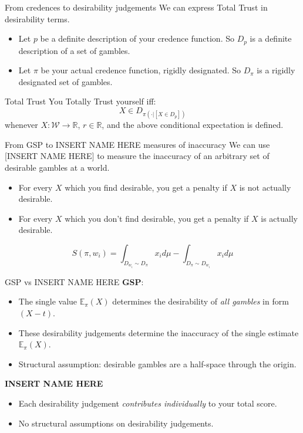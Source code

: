 \documentclass[aspectratio=169, dvipsnames]{beamer}
\newcommand{\R}{\mathbb{R}}
\newcommand{\E}{\mathbb{E}}
\newcommand{\W}{\mathcal{W}}
\begin{document}
\begin{frame}{From credences to desirability judgements}
  We can express Total Trust in desirability terms.
  \begin{itemize}
  \item Let $p$ be a definite description of your credence function. So $D_p$ is a definite description of a set of gambles.
  \item Let $\pi$ be your actual credence function, rigidly designated. So $D_{\pi}$ is a rigidly designated set of gambles.
  \end{itemize}
  \begin{block}{Total Trust}
    You Totally Trust yourself iff:
    \begin{equation}
      \label{totTrust}
      X \in D_{\pi(\cdot| [X \in D_p])}
    \end{equation}
    whenever $X: \W \to \R$, $r \in \R$, and the above conditional expectation is defined.
  \end{block}
\end{frame}

\begin{frame}{From GSP to INSERT NAME HERE measures of inaccuracy}
  We can use [INSERT NAME HERE] to measure the inaccuracy of an arbitrary set of desirable gambles at a
  world.
  \begin{itemize}
  \item For every $X$ which you find desirable, you get a penalty if $X$ is not actually desirable.
  \item For every $X$ which you don't find desirable, you get a penalty if $X$ is actually desirable.
  \end{itemize}
  \begin{equation}
      \label{KonekScoreDefAppendix}
      S(\pi, w_i) = \int_{D_{w_i} \sim D_{\pi}} x_i d\mu - \int_{D_{\pi} \sim D_{w_i}} x_i d\mu 
    \end{equation}
\end{frame}

\begin{frame}{GSP vs INSERT NAME HERE}
  \textbf{GSP}:
  \begin{itemize}
  \item The single value $\E_{\pi}(X)$ determines the desirability of \textit{all gambles} in form $(X - t)$.
  \item These desirability judgements determine the inaccuracy of the single estimate $\E_{\pi}(X)$.
  \item Structural assumption: desirable gambles are a half-space through the origin.
  \end{itemize}
  \textbf{INSERT NAME HERE}
  \begin{itemize}
  \item Each desirability judgement \textit{contributes individually} to your total score.
  \item No structural assumptions on desirability judgements.
  \end{itemize}
\end{frame}
\end{document}
